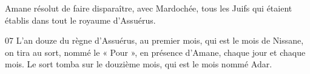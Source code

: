 Amane résolut de faire disparaître, avec Mardochée, tous les Juifs qui étaient établis dans tout le royaume d’Assuérus.

07 L’an douze du règne d’Assuérus, au premier mois, qui est le mois de Nissane, on tira au sort, nommé le « Pour », en présence d’Amane, chaque jour et chaque mois. Le sort tomba sur le douzième mois, qui est le mois nommé Adar.